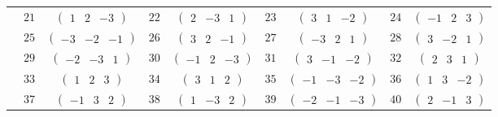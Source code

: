 \documentclass[fleqn,10pt,landscape]{article}
\begin{document}
\begin{itemize}
{\begin{center}
\begin{longtable}{ccccccccc}
& $ 21 $ & $ \begin{pmatrix} 1 & 2 & -3 \end{pmatrix} $ & $ 22 $ & $ \begin{pmatrix} 2 & -3 & 1 \end{pmatrix} $ & $ 23 $ & $ \begin{pmatrix} 3 & 1 & -2 \end{pmatrix} $ & $ 24 $ & $ \begin{pmatrix} -1 & 2 & 3 \end{pmatrix} $ \\
& $ 25 $ & $ \begin{pmatrix} -3 & -2 & -1 \end{pmatrix} $ & $ 26 $ & $ \begin{pmatrix} 3 & 2 & -1 \end{pmatrix} $ & $ 27 $ & $ \begin{pmatrix} -3 & 2 & 1 \end{pmatrix} $ & $ 28 $ & $ \begin{pmatrix} 3 & -2 & 1 \end{pmatrix} $ \\
& $ 29 $ & $ \begin{pmatrix} -2 & -3 & 1 \end{pmatrix} $ & $ 30 $ & $ \begin{pmatrix} -1 & 2 & -3 \end{pmatrix} $ & $ 31 $ & $ \begin{pmatrix} 3 & -1 & -2 \end{pmatrix} $ & $ 32 $ & $ \begin{pmatrix} 2 & 3 & 1 \end{pmatrix} $ \\
& $ 33 $ & $ \begin{pmatrix} 1 & 2 & 3 \end{pmatrix} $ & $ 34 $ & $ \begin{pmatrix} 3 & 1 & 2 \end{pmatrix} $ & $ 35 $ & $ \begin{pmatrix} -1 & -3 & -2 \end{pmatrix} $ & $ 36 $ & $ \begin{pmatrix} 1 & 3 & -2 \end{pmatrix} $ \\
& $ 37 $ & $ \begin{pmatrix} -1 & 3 & 2 \end{pmatrix} $ & $ 38 $ & $ \begin{pmatrix} 1 & -3 & 2 \end{pmatrix} $ & $ 39 $ & $ \begin{pmatrix} -2 & -1 & -3 \end{pmatrix} $ & $ 40 $ & $ \begin{pmatrix} 2 & -1 & 3 \end{pmatrix} $ \\

\end{longtable}
\end{center}}
\end{itemize}
\end{document}
